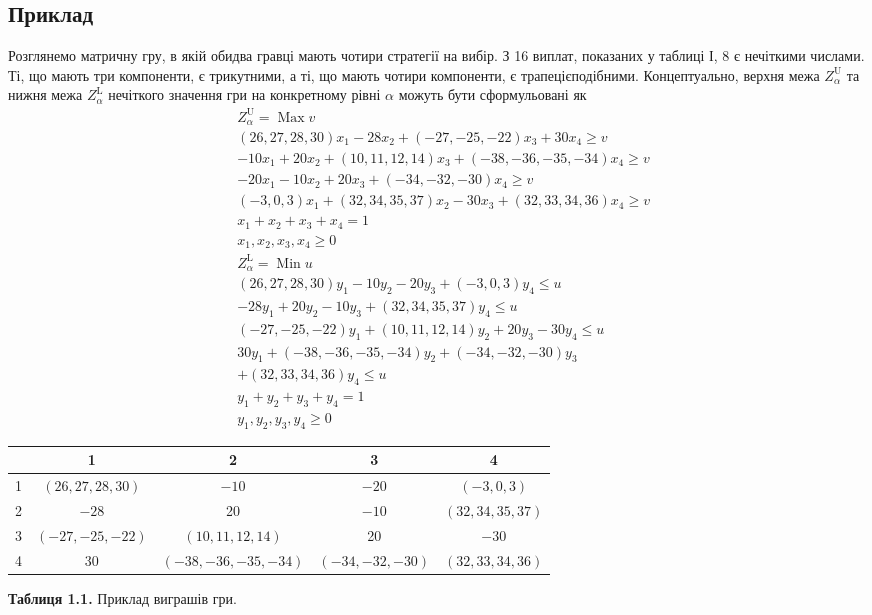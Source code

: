 \documentclass[14pt, a4paper, oneside]{extarticle}
\numberwithin{equation}{section}
\begin{document}
\subsection{Приклад}
Розглянемо матричну гру, в якій обидва гравці мають чотири стратегії на вибір. З 16 виплат, показаних у таблиці І, 8 є нечіткими числами. Ті, що мають три компоненти, є трикутними, а ті, що мають чотири компоненти, є трапецієподібними. Концептуально, верхня межа $Z_{\alpha}^{\mathrm{U}}$ та нижня межа $Z_{\alpha}^{\mathrm{L}}$ нечіткого значення гри на конкретному рівні $\alpha$ можуть бути сформульовані як\\
\begin{equation*}
\begin{aligned}
& Z_{\alpha}^{\mathrm{U}}=\operatorname{Max} v \\
& (26,27,28,30) x_{1}-28 x_{2}+(-27,-25,-22) x_{3}+30 x_{4} \geq v \\
& -10 x_{1}+20 x_{2}+(10,11,12,14) x_{3}+(-38,-36,-35,-34) x_{4} \geq v \\
& -20 x_{1}-10 x_{2}+20 x_{3}+(-34,-32,-30) x_{4} \geq v \\
& (-3,0,3) x_{1}+(32,34,35,37) x_{2}-30 x_{3}+(32,33,34,36) x_{4} \geq v \\
& x_{1}+x_{2}+x_{3}+x_{4}=1 \\
& x_{1}, x_{2}, x_{3}, x_{4} \geq 0\\
& Z_{\alpha}^{\mathrm{L}}=\operatorname{Min} u \\
& (26,27,28,30) y_{1}-10 y_{2}-20 y_{3}+(-3,0,3) y_{4} \leq u \\
&-28 y_{1}+20 y_{2}-10 y_{3}+(32,34,35,37) y_{4} \leq u \\
&(-27,-25,-22) y_{1}+(10,11,12,14) y_{2}+20 y_{3}-30 y_{4} \leq u \\
& 30 y_{1}+(-38,-36,-35,-34) y_{2}+(-34,-32,-30) y_{3} \\
&+(32,33,34,36) y_{4} \leq u \\
& y_{1}+y_{2}+y_{3}+y_{4}=1 \\
& y_{1}, y_{2}, y_{3}, y_{4} \geq 0
\end{aligned}
\end{equation*}

\begin{center}
\begin{tabular}{|c|cccc|}
\hline
& 1 & 2 & 3 & 4 \\
\hline
1 & $(26,27,28,30)$ & $-10$ & $-20$ & $(-3,0,3)$ \\
2 & $-28$ & 20 & $-10$ & $(32,34,35,37)$ \\
3 & $(-27,-25,-22)$ & $(10,11,12,14)$ & 20 & $-30$ \\
4 & 30 & $(-38,-36,-35,-34)$ & $(-34,-32,-30)$ & $(32,33,34,36)$ \\
\hline
\end{tabular}
\end{center}
\begin{center}
    \textbf{Таблиця 1.1.} Приклад виграшів гри.
\end{center}
\end{document}
